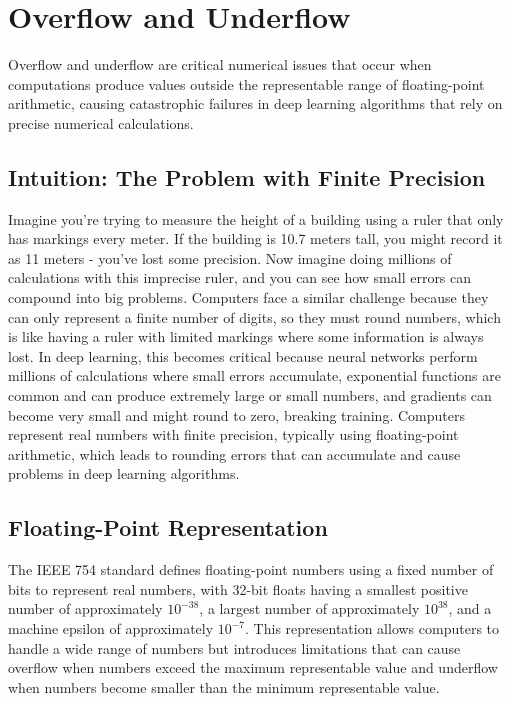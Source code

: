 
\section{Overflow and Underflow }
\label{sec:overflow-underflow}

Overflow and underflow are critical numerical issues that occur when computations produce values outside the representable range of floating-point arithmetic, causing catastrophic failures in deep learning algorithms that rely on precise numerical calculations.

\subsection{Intuition: The Problem with Finite Precision}

Imagine you're trying to measure the height of a building using a ruler that only has markings every meter. If the building is 10.7 meters tall, you might record it as 11 meters - you've lost some precision. Now imagine doing millions of calculations with this imprecise ruler, and you can see how small errors can compound into big problems. Computers face a similar challenge because they can only represent a finite number of digits, so they must round numbers, which is like having a ruler with limited markings where some information is always lost. In deep learning, this becomes critical because neural networks perform millions of calculations where small errors accumulate, exponential functions are common and can produce extremely large or small numbers, and gradients can become very small and might round to zero, breaking training. Computers represent real numbers with finite precision, typically using floating-point arithmetic, which leads to rounding errors that can accumulate and cause problems in deep learning algorithms.

\subsection{Floating-Point Representation}

The IEEE 754 standard defines floating-point numbers using a fixed number of bits to represent real numbers, with 32-bit floats having a smallest positive number of approximately $10^{-38}$, a largest number of approximately $10^{38}$, and a machine epsilon of approximately $10^{-7}$. This representation allows computers to handle a wide range of numbers but introduces limitations that can cause overflow when numbers exceed the maximum representable value and underflow when numbers become smaller than the minimum representable value.


